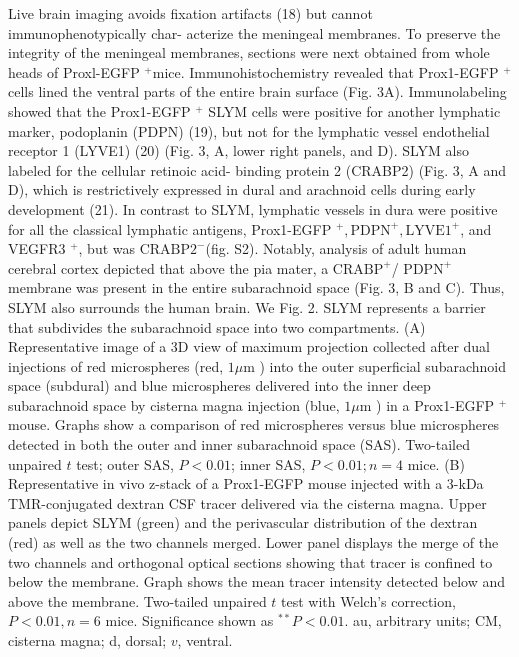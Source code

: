 Live brain imaging avoids fixation artifacts (18) but cannot immunophenotypically char- acterize the meningeal membranes. To preserve the integrity of the meningeal membranes, sections were next obtained from whole heads of Proxl-EGFP ${ }^{+}$mice. Immunohistochemistry revealed that Prox1-EGFP ${ }^{+}$cells lined the ventral parts of the entire brain surface (Fig. 3A). Immunolabeling showed that the Prox1-EGFP ${ }^{+}$ SLYM cells were positive for another lymphatic marker, podoplanin (PDPN) (19), but not for the lymphatic vessel endothelial receptor 1 (LYVE1) (20) (Fig. 3, A, lower right panels, and D). SLYM also labeled for the cellular retinoic acid- binding protein 2 (CRABP2) (Fig. 3, A and D), which is restrictively expressed in dural and arachnoid cells during early development (21). In contrast to SLYM, lymphatic vessels in dura were positive for all the classical lymphatic antigens, Prox1-EGFP ${ }^{+}, \mathrm{PDPN}^{+}, \mathrm{LYVE1}^{+}$, and VEGFR3 $^{+}$, but was $\mathrm{CRABP2}^{-}$(fig. S2). Notably, analysis of adult human cerebral cortex depicted that above the pia mater, a $\mathrm{CRABP}^{+}$/ $\mathrm{PDPN}^{+}$membrane was present in the entire subarachnoid space (Fig. 3, B and C). Thus, SLYM also surrounds the human brain. We Fig. 2. SLYM represents a barrier that subdivides the subarachnoid space into two compartments. (A) Representative image of a 3D view of maximum projection collected after dual injections of red microspheres (red, $1 \mu \mathrm{m}$ ) into the outer superficial subarachnoid space (subdural) and blue microspheres delivered into the inner deep subarachnoid space by cisterna magna injection (blue, $1 \mu \mathrm{m}$ ) in a Prox1-EGFP ${ }^{+}$mouse. Graphs show a comparison of red microspheres versus blue microspheres detected in both the outer and inner subarachnoid space (SAS). Two-tailed unpaired $t$ test; outer SAS, $P<0.01$; inner SAS, $P<0.01 ; n=4$ mice. (B) Representative in vivo z-stack of a Prox1-EGFP mouse injected with a 3-kDa TMR-conjugated dextran CSF tracer delivered via the cisterna magna. Upper panels depict SLYM (green) and the perivascular distribution of the dextran (red) as well as the two channels merged. Lower panel displays the merge of the two channels and orthogonal optical sections showing that tracer is confined to below the membrane. Graph shows the mean tracer intensity detected below and above the membrane. Two-tailed unpaired $t$ test with Welch's correction, $P<0.01, n=6$ mice. Significance shown as ${ }^{* *} P<0.01$. au, arbitrary units; CM, cisterna magna; d, dorsal; $v$, ventral.

